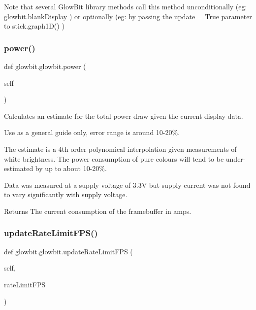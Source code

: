 Note that several Glow\+Bit library methods call this method unconditionally (eg\+: glowbit.\+blank\+Display ) or optionally (eg\+: by passing the update = True parameter to stick.\+graph1\+D() ) \mbox{\label{classglowbit_1_1glowbit_a0f41651679b85f423017f309bd477666}} 
\subsubsection{\texorpdfstring{power()}{power()}}
{\footnotesize\ttfamily def glowbit.\+glowbit.\+power (\begin{DoxyParamCaption}\item[{}]{self }\end{DoxyParamCaption})}



Calculates an estimate for the total power draw given the current display data. 

Use as a general guide only, error range is around 10-\/20\%.

The estimate is a 4th order polynomical interpolation given measurements of white brightness. The power consumption of pure colours will tend to be under-\/estimated by up to about 10-\/20\%.

Data was measured at a supply voltage of 3.\+3V but supply current was not found to vary significantly with supply voltage.

\begin{DoxyReturn}{Returns}
The current consumption of the framebuffer in amps. 
\end{DoxyReturn}
\mbox{\label{classglowbit_1_1glowbit_a7f72cb0878a688aa6181d4632428da09}} 
\subsubsection{\texorpdfstring{update\+Rate\+Limit\+F\+P\+S()}{updateRateLimitFPS()}}
{\footnotesize\ttfamily def glowbit.\+glowbit.\+update\+Rate\+Limit\+F\+PS (\begin{DoxyParamCaption}\item[{}]{self,  }\item[{}]{rate\+Limit\+F\+PS }\end{DoxyParamCaption})}



